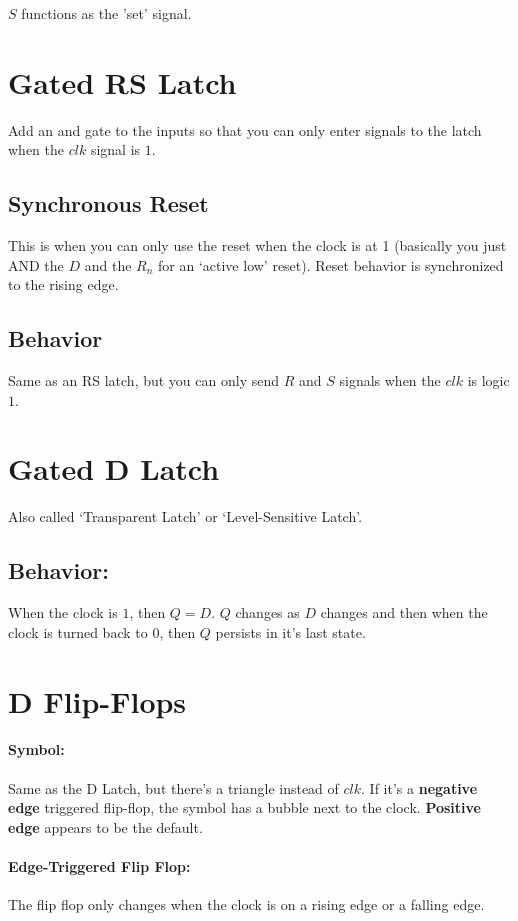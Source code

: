 \documentclass[a4paper,12pt]{report}
\begin{document}
$S$ functions as the 'set' signal. 


\section{Gated RS Latch}
Add an and gate to the inputs so that you can only enter signals to the latch when 
the $clk$ signal is $1$.

\subsection{Synchronous Reset}
This is when you can only use the reset when the clock is at 1 (basically you just 
AND the $D$ and the $R_n$ for an `active low' reset). Reset behavior is synchronized to the rising edge. 

\subsection{Behavior} 
Same as an RS latch, but you can only send $R$ and $S$ signals when the $clk$ is logic $1$.

\section{Gated D Latch}
Also called `Transparent Latch' or `Level-Sensitive Latch'. 

\subsection{Behavior: } When the clock is $1$, then $Q = D$. $Q$ changes as $D$ changes 
and then when the clock is turned back to $0$, then $Q$ persists in it's last state. 

\section{D Flip-Flops}
\paragraph{Symbol: } Same as the D Latch, but there's a triangle instead of $clk$. If 
it's a \textbf{negative edge} triggered flip-flop, the symbol has a bubble next to the 
clock. \textbf{Positive edge} appears to be the default. 

\paragraph{Edge-Triggered Flip Flop: } The flip flop only changes when the clock is 
on a rising edge or a falling edge. 
\end{document}
